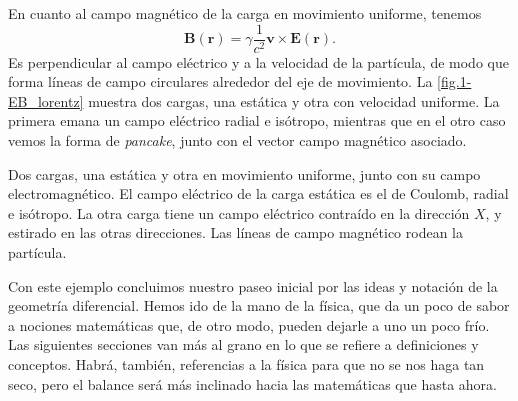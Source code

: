 \begin{example}
    En cuanto al campo magnético de la carga en movimiento uniforme, tenemos
    \begin{equation}
        \mathbf{B}(\mathbf{r}) = \gamma\frac{1}{c^2}\mathbf{v}\times\mathbf{E}(\mathbf{r}).
    \end{equation}
    Es perpendicular al campo eléctrico y a la velocidad de la partícula, de modo que forma líneas de campo circulares alrededor del eje de movimiento. La \cref{fig.1-EB_lorentz} muestra dos cargas, una estática y otra con velocidad uniforme. La primera emana un campo eléctrico radial e isótropo, mientras que en el otro caso vemos la forma de \textit{pancake}, junto con el vector campo magnético asociado.
    \begin{figbox}[0.5]
        {Dos cargas, una estática y otra en movimiento uniforme, junto con su campo electromagnético. El campo eléctrico de la carga estática es el de Coulomb, radial e isótropo. La otra carga tiene un campo eléctrico contraído en la dirección \(X\), y estirado en las otras direcciones. Las líneas de campo magnético rodean la partícula.
        \label{fig.1-EB_lorentz}}
        
    \end{figbox}

\end{example}

Con este ejemplo concluimos nuestro paseo inicial por las ideas y notación de la geometría diferencial. Hemos ido de la mano de la física, que da un poco de sabor a nociones matemáticas que, de otro modo, pueden dejarle a uno un poco frío. Las siguientes secciones van más al grano en lo que se refiere a definiciones y conceptos. Habrá, también, referencias a la física para que no se nos haga tan seco, pero el balance será más inclinado hacia las matemáticas que hasta ahora. 